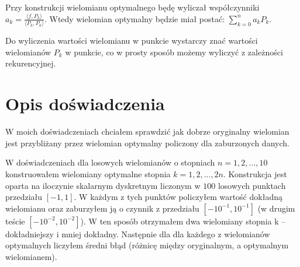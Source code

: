 \documentclass[a4paper]{article}
\theoremstyle{definition}
\theoremstyle{theorem}
\begin{document}
Przy konstrukcji wielomianu optymalnego będę wyliczał współczynniki 
$a_k = \frac{\langle f, P_k\rangle}{\langle P_k,P_k\rangle}$. Wtedy wielomian 
optymalny będzie miał postać: $ \sum_{k=0}^na_kP_k$.

Do wyliczenia wartości wielomianu w punkcie wystarczy znać wartości wielomianów
$P_k$ w punkcie, co w prosty sposób możemy wyliczyć z zależności rekurencyjnej.

\section{Opis doświadczenia}
W moich doświadczeniach chciałem sprawdzić jak dobrze oryginalny wielomian jest 
przybliżany przez wielomian optymalny policzony dla zaburzonych danych.


W doświadczeniach dla losowych wielomianów o stopniach $n = 1, 2, ..., 10$ 
konstruowałem wielomiany optymalne stopnia $k = 1, 2, ..., 2n$. Konstrukcja jest 
oparta na iloczynie skalarnym dyskretnym liczonym w $100$ losowych punktach przedziału 
$[-1, 1]$. W każdym z tych punktów policzyłem wartość dokładną wielomianu oraz zaburzyłem
ją o czynnik z przedziału $[-10^{-1}, 10^{-1}]$ (w drugim teście $[-10^{-2}, 10^{-2}]$).
W ten sposób otrzymałem dwa wielomiany stopnia k -- dokładniejszy i mniej dokładny. 
Następnie dla dla każdego z wielomianów optymalnych liczyłem średni błąd (różnicę między 
oryginalnym, a optymalnym wielomianem).
\end{document}
